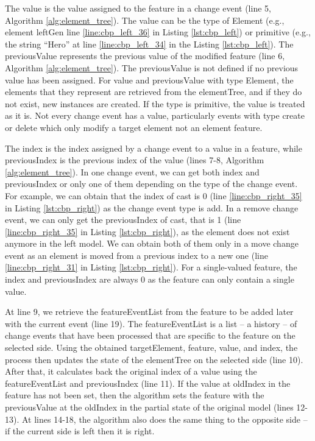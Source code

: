 The \textsf{value} is the value assigned to the feature in a change event (line 5, Algorithm \ref{alg:element_tree}). The \textsf{value} can be the type of \textsf{Element} (e.g., element \textsf{leftGen} line \ref{line:cbp_left_36} in Listing \ref{lst:cbp_left}) or primitive (e.g., the string ``Hero'' at line \ref{line:cbp_left_34} in the Listing \ref{lst:cbp_left}). The \textsf{previousValue} represents the previous value of the modified feature (line 6, Algorithm \ref{alg:element_tree}). The \textsf{previousValue} is not defined if no previous value has been assigned. For \textsf{value} and \textsf{previousValue} with type \textsf{Element}, the elements that they represent are retrieved from the \textsf{elementTree}, and if they do not exist, new instances are created. If the type is primitive, the value is treated as it is. Not every change event has a \textsf{value}, particularly events with type \textsf{create} 
or \textsf{delete} which only modify a target element not an element feature.

The \textsf{index} is the index assigned by a change event to a value in a feature, while \textsf{previousIndex} is the previous index of the value (lines 7-8, Algorithm \ref{alg:element_tree}). In one change event, we can get both \textsf{index} and \textsf{previousIndex} or only one of them depending on the type of the change event. For example, we can obtain that the \textsf{index} of \textsf{cast} is 0 (line \ref{line:cbp_right_35} in Listing \ref{lst:cbp_right}) as the change event type is \textsf{add}. In a \textsf{remove} change event, we can only get the \textsf{previousIndex} of \textsf{cast}, that is 1 (line \ref{line:cbp_right_35} in Listing \ref{lst:cbp_right}), as the element does not exist anymore in the left model. We can obtain both of them only in a \textsf{move} change event as an element is moved from a previous index to a new one (line \ref{line:cbp_right_31} in Listing \ref{lst:cbp_right}). For a single-valued feature, the \textsf{index} and \textsf{previousIndex} are always 0 as the feature can only contain a single value. 

At line 9, we retrieve the \textsf{featureEventList} from the \textsf{feature} to be added later with the current \textsf{event} (line 19). The \textsf{featureEventList} is a list -- a history -- of change events that have been processed that are specific to the \textsf{feature} on the selected \textsf{side}. Using the obtained \textsf{targetElement}, \textsf{feature}, \textsf{value}, and \textsf{index}, the process then updates the state of the \textsf{elementTree} on the selected \textsf{side} (line 10). After that, it calculates back the original index of a value using the \textsf{featureEventList} and \textsf{previousIndex} (line 11). If the value at \textsf{oldIndex} in the \textsf{feature} has not been set, then the algorithm sets the \textsf{feature} with the \textsf{previousValue} at the \textsf{oldIndex} in the partial state of the original model (lines 12-13). At lines 14-18, the algorithm also does the same thing to the opposite side -- if the current \textsf{side} is \textsf{left} then it is \textsf{right}.  

